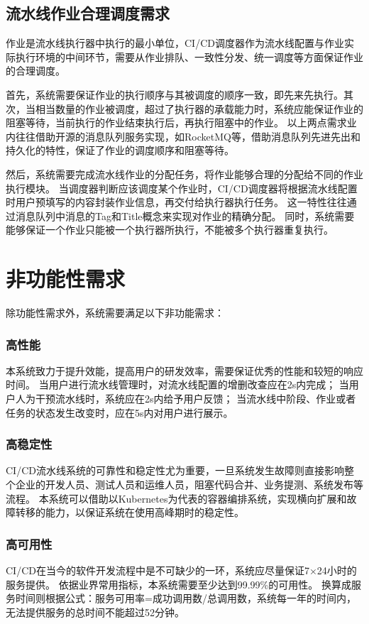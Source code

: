 \subsection{流水线作业合理调度需求}
\label{subsec:流水线作业合理调度需求}

作业是流水线执行器中执行的最小单位，CI/CD调度器作为流水线配置与作业实际执行环境的中间环节，需要从作业排队、一致性分发、统一调度等方面保证作业的合理调度。

首先，系统需要保证作业的执行顺序与其被调度的顺序一致，即先来先执行。其次，当相当数量的作业被调度，超过了执行器的承载能力时，系统应能保证作业的阻塞等待，当前执行的作业结束执行后，再执行阻塞中的作业。
以上两点需求业内往往借助开源的消息队列服务实现，如RocketMQ等，借助消息队列先进先出和持久化的特性，保证了作业的调度顺序和阻塞等待。

然后，系统需要完成流水线作业的分配任务，将作业能够合理的分配给不同的作业执行模块。
当调度器判断应该调度某个作业时，CI/CD调度器将根据流水线配置时用户预填写的内容封装作业信息，再交付给执行器执行任务。
这一特性往往通过消息队列中消息的Tag和Title概念来实现对作业的精确分配。
同时，系统需要能够保证一个作业只能被一个执行器所执行，不能被多个执行器重复执行。


\section{非功能性需求}

除功能性需求外，系统需要满足以下非功能需求：

\subsubsection{高性能}
本系统致力于提升效能，提高用户的研发效率，需要保证优秀的性能和较短的响应时间。
当用户进行流水线管理时，对流水线配置的增删改查应在2s内完成；
当用户人为干预流水线时，系统应在2s内给予用户反馈；
当流水线中阶段、作业或者任务的状态发生改变时，应在5s内对用户进行展示。

\subsubsection{高稳定性}
CI/CD流水线系统的可靠性和稳定性尤为重要，一旦系统发生故障则直接影响整个企业的开发人员、测试人员和运维人员，阻塞代码合并、业务提测、系统发布等流程。
本系统可以借助以Kubernetes为代表的容器编排系统，实现横向扩展和故障转移的能力，以保证系统在使用高峰期时的稳定性。

\subsubsection{高可用性}
CI/CD在当今的软件开发流程中是不可缺少的一环，系统应尽量保证7×24小时的服务提供。
依据业界常用指标，本系统需要至少达到99.99\%的可用性。
换算成服务时间则根据公式：服务可用率=成功调用数/总调用数，系统每一年的时间内，无法提供服务的总时间不能超过52分钟。

